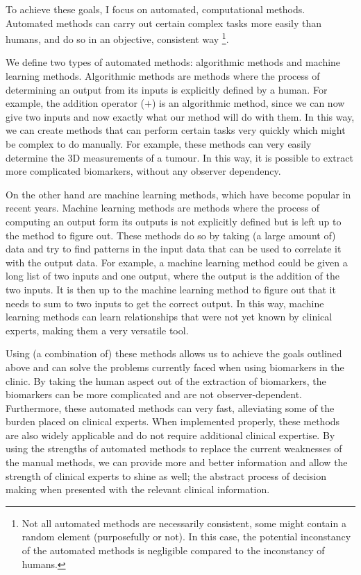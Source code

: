 To achieve these goals, I focus on automated, computational methods.
Automated methods can carry out certain complex tasks more easily than humans, and do so in an objective, consistent way \footnote{Not all automated methods are necessarily consistent, some might contain a random element (purposefully or not). In this case, the potential inconstancy of the automated methods is negligible compared to the inconstancy of humans.}.

We define two types of automated methods: algorithmic methods and machine learning methods.
Algorithmic methods are methods where the process of determining an output from its inputs is explicitly defined by a human.
For example, the addition operator ($+$) is an algorithmic method, since we can now give two inputs and now exactly what our method will do with them.
In this way, we can create methods that can perform certain tasks very quickly which might be complex to do manually.
For example, these methods can very easily determine the 3D measurements of a tumour.
In this way, it is possible to extract more complicated biomarkers, without any observer dependency.

On the other hand are machine learning methods, which have become popular in recent years.
Machine learning methods are methods where the process of computing an output form its outputs is not explicitly defined but is left up to the method to figure out.
These methods do so by taking (a large amount of) data and try to find patterns in the input data that can be used to correlate it with the output data.
For example, a machine learning method could be given a long list of two inputs and one output, where the output is the addition of the two inputs.
It is then up to the machine learning method to figure out that it needs to sum to two inputs to get the correct output.
In this way, machine learning methods can learn relationships that were not yet known by clinical experts, making them a very versatile tool.

Using (a combination of) these methods allows us to achieve the goals outlined above and can solve the problems currently faced when using biomarkers in the clinic.
By taking the human aspect out of the extraction of biomarkers, the biomarkers can be more complicated and are not observer-dependent.
Furthermore, these automated methods can very fast, alleviating some of the burden placed on clinical experts.
When implemented properly, these methods are also widely applicable and do not require additional clinical expertise.
By using the strengths of automated methods to replace the current weaknesses of the manual methods, we can provide more and better information and allow the strength of clinical experts to shine as well; the abstract process of decision making when presented with the relevant clinical information.

